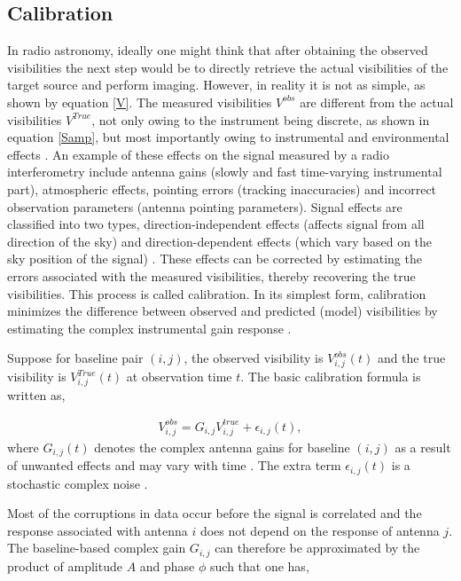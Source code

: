 \subsection{Calibration}
\label{Calib}
In radio astronomy, ideally one might think that after obtaining the observed visibilities the next step would be to directly retrieve the actual visibilities of the target source and perform imaging. However, in reality it is not as simple, as shown by equation \ref{V}. The measured visibilities $V^{obs}$ are different from the actual visibilities $V^{True}$, not only owing to the instrument being discrete, as shown in equation \ref{Samp}, but most importantly owing to instrumental and environmental effects \citep{thompson2017interferometry}. An example of these effects on the signal measured by a radio interferometry include antenna gains (slowly and fast time-varying instrumental part), atmospheric effects, pointing errors (tracking inaccuracies) and incorrect observation parameters (antenna pointing parameters). Signal effects are classified into two types, direction-independent effects (affects signal from all direction of the sky) and direction-dependent effects (which vary based on the sky position of the signal) \citep{taylor1999synthesis}. These effects can be corrected by estimating the errors associated with the measured visibilities, thereby recovering the true visibilities. This process is called calibration. In its simplest form, calibration minimizes the difference between observed and predicted (model) visibilities by estimating the complex instrumental gain response \citep{grobler2016calibration}. 

Suppose for baseline pair $(i,j)$, the observed visibility is $V^{obs}_{i,j}(t)$ and the true visibility is $V^{True}_{i,j}(t)$ at observation time $t$. The basic calibration formula is written as,

\begin{align}
V_{i,j}^{obs}=G_{i,j} V_{i,j}^{true} + \epsilon_{i,j}(t) ,
\end{align}
where $G_{i,j}(t)$ denotes the complex antenna gains for baseline $(i,j)$ as a result of unwanted effects and may vary with time \citep{thompson2001interferometry}. The extra term $ \epsilon_{i,j}(t)$ is a stochastic complex noise \citep{taylor1999synthesis}.

Most of the corruptions in data occur before the signal is correlated and the response associated with antenna  $i$  does not depend on the response of antenna $j$. The baseline-based complex gain $G_{i,j}$ can therefore be approximated by the product of amplitude $A$ and phase $\phi$ such that one has,  

